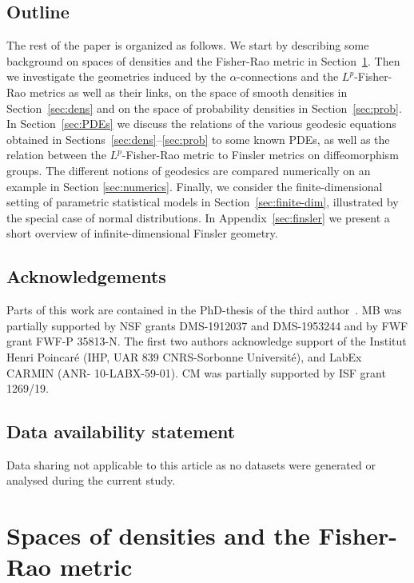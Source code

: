 \documentclass[11pt]{amsart}
\theoremstyle{definition}
\begin{document}
\subsection{Outline}

The rest of the paper is organized as follows. We start  by describing some background on spaces of densities and the Fisher-Rao metric in Section~\ref{sec:background}. Then we investigate the geometries induced by the $\alpha$-connections and the $L^p$-Fisher-Rao metrics as well as their links, on the space of smooth densities in Section~\ref{sec:dens} and on the space of probability densities in Section~\ref{sec:prob}. 
In Section~\ref{sec:PDEs} we discuss the relations of the various geodesic equations obtained in Sections~\ref{sec:dens}--\ref{sec:prob} to some known PDEs, as well as the relation between the $L^p$-Fisher-Rao metric to Finsler metrics on diffeomorphism groups.
The different notions of geodesics are compared numerically on an example in Section \ref{sec:numerics}. 
Finally, we consider the finite-dimensional setting of parametric statistical models in Section~\ref{sec:finite-dim}, illustrated by the special case of normal distributions.
In Appendix~\ref{sec:finsler} we present a short overview of infinite-dimensional Finsler geometry.

\subsection*{Acknowledgements}
Parts of this work are contained in the PhD-thesis of the third author~\cite{Lu_thesis2023}.
MB was partially supported
by NSF grants DMS-1912037 and DMS-1953244 and by FWF grant FWF-P 35813-N. The first two authors acknowledge support of the Institut Henri Poincar{\'e} (IHP, UAR 839 CNRS-Sorbonne Universit{\'e}), and LabEx CARMIN (ANR-
10-LABX-59-01).
CM was partially supported by ISF grant 1269/19. 
\subsection*{Data availability statement}
Data sharing not applicable to this article as no datasets were generated or analysed during the current study.



\section{Spaces of densities and the Fisher-Rao metric}\label{sec:background}
\end{document}
